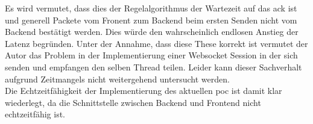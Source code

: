 Es wird vermutet, dass dies der Regelalgorithmus der Wartezeit auf das \ac{ack} ist und generell Packete vom Fronent zum Backend beim ersten Senden nicht vom Backend bestätigt werden.
Dies würde den wahrscheinlich endlosen Anstieg der Latenz begründen.
Unter der Annahme, dass diese These korrekt ist vermutet der Autor das Problem in der Implementierung einer Websocket Session in der sich senden und empfangen den selben Thread teilen.
Leider kann dieser Sachverhalt aufgrund Zeitmangels nicht weitergehend untersucht werden.
\\Die Echtzeitfähigkeit der Implementierung des aktuellen \ac{poc} ist damit klar wiederlegt, da die Schnittstelle zwischen Backend und Frontend nicht echtzeitfähig ist.
